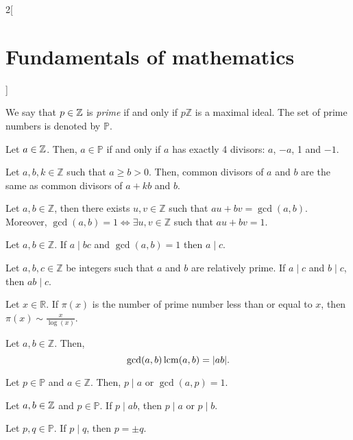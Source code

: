\documentclass[../../../main.tex]{subfiles}
\begin{document}
\begin{multicols}{2}[\section{Fundamentals of mathematics}]
    \begin{definition}
        We say that $p\in\mathbb{Z}$ is \textit{prime} if and only if $p\mathbb{Z}$ is a maximal ideal. The set of prime numbers is denoted by $\mathbb{P}$.
    \end{definition}
    \begin{prop}
        Let $a\in\mathbb{Z}$. Then, $a\in\mathbb{P}$ if and only if $a$ has exactly 4 divisors: $a$, $-a$, 1 and $-1$.
    \end{prop}
    \begin{lemma}
        Let $a,b,k\in\mathbb{Z}$ such that $a\geq b>0$. Then, common divisors of $a$ and $b$ are the same as common divisors of $a+kb$ and $b$.
    \end{lemma}
    \begin{theorem}
        Let $a,b\in\mathbb{Z}$, then there exists $u,v\in\mathbb{Z}$ such that $au+bv=\gcd(a,b)$. Moreover, $\gcd(a,b)=1\iff\exists u,v\in\mathbb{Z}$ such that $au+bv=1$.
    \end{theorem}
    \begin{theorem}
        Let $a,b\in\mathbb{Z}$. If $a\mid bc$ and $\gcd(a,b)=1$ then $a\mid c$.
    \end{theorem}
    \begin{corollary}
        Let $a,b,c\in\mathbb{Z}$ be integers such that $a$ and $b$ are relatively prime. If $a\mid c$ and $b\mid c$, then $ab\mid c$.
    \end{corollary}
    \begin{theorem}
        Let $x\in\mathbb{R}$. If $\pi(x)$ is the number of prime number less than or equal to $x$, then $\pi(x)\sim\frac{x}{\log(x)}$.
    \end{theorem}
    \begin{theorem}
        Let $a,b\in\mathbb{Z}$. Then, $$\gcd(a,b)\operatorname{lcm}(a,b)=|ab|.$$
    \end{theorem}
    \begin{lemma}
        Let $p\in\mathbb{P}$ and $a\in\mathbb{Z}$. Then, $p\mid a$ or $\gcd(a,p)=1$.
    \end{lemma}
    \begin{corollary}
        Let $a,b\in\mathbb{Z}$ and $p\in\mathbb{P}$. If $p\mid ab$, then $p\mid a$ or $p\mid b$.
    \end{corollary}
    \begin{corollary}
        Let $p,q\in\mathbb{P}$. If $p\mid q$, then $p=\pm q$.
    \end{corollary}
    \begin{theorem}

\end{theorem}
\end{multicols}
\end{document}
